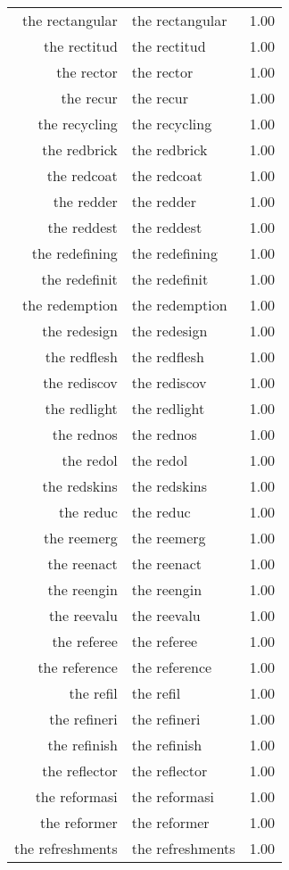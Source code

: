 \begin{table}[ht]
\begin{tabular}{rlr}
  the rectangular & the rectangular & 1.00 \\ 
  the rectitud & the rectitud & 1.00 \\ 
  the rector & the rector & 1.00 \\ 
  the recur & the recur & 1.00 \\ 
  the recycling & the recycling & 1.00 \\ 
  the redbrick & the redbrick & 1.00 \\ 
  the redcoat & the redcoat & 1.00 \\ 
  the redder & the redder & 1.00 \\ 
  the reddest & the reddest & 1.00 \\ 
  the redefining & the redefining & 1.00 \\ 
  the redefinit & the redefinit & 1.00 \\ 
  the redemption & the redemption & 1.00 \\ 
  the redesign & the redesign & 1.00 \\ 
  the redflesh & the redflesh & 1.00 \\ 
  the rediscov & the rediscov & 1.00 \\ 
  the redlight & the redlight & 1.00 \\ 
  the rednos & the rednos & 1.00 \\ 
  the redol & the redol & 1.00 \\ 
  the redskins & the redskins & 1.00 \\ 
  the reduc & the reduc & 1.00 \\ 
  the reemerg & the reemerg & 1.00 \\ 
  the reenact & the reenact & 1.00 \\ 
  the reengin & the reengin & 1.00 \\ 
  the reevalu & the reevalu & 1.00 \\ 
  the referee & the referee & 1.00 \\ 
  the reference & the reference & 1.00 \\ 
  the refil & the refil & 1.00 \\ 
  the refineri & the refineri & 1.00 \\ 
  the refinish & the refinish & 1.00 \\ 
  the reflector & the reflector & 1.00 \\ 
  the reformasi & the reformasi & 1.00 \\ 
  the reformer & the reformer & 1.00 \\ 
  the refreshments & the refreshments & 1.00 \\ 

\end{tabular}
\end{table}

